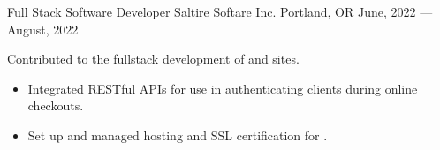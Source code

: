 \showoff
{Full Stack Software Developer}
{Saltire Softare Inc.}
{Portland, OR}
{June, 2022 --- August, 2022}

Contributed to the fullstack development of  and  sites.

\begin{itemize}[label=$\triangleright$]
    \item Integrated RESTful APIs for use in authenticating clients during online checkouts.
    \item Set up and managed hosting and SSL certification for .
\end{itemize}
